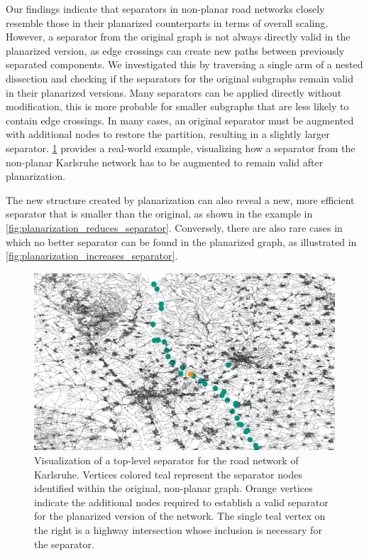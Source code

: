 Our findings indicate that separators in non-planar road networks closely resemble those in their planarized counterparts in terms of overall scaling.
However, a separator from the original graph is not always directly valid in the planarized version, as edge crossings can create new paths between previously separated components.
We investigated this by traversing a single arm of a nested dissection and checking if the separators for the original subgraphs remain valid in their planarized versions.
Many separators can be applied directly without modification, this is more probable for smaller subgraphs that are less likely to contain edge crossings.
In many cases, an original separator must be augmented with additional nodes to restore the partition, resulting in a slightly larger separator.
\cref{fig:karlsruhe_planar_vs_non_planar} provides a real-world example, visualizing how a separator from the non-planar Karlsruhe network has to be augmented to remain valid after planarization.

The new structure created by planarization can also reveal a new, more efficient separator that is smaller than the original, as shown in the example in \cref{fig:planarization_reduces_separator}.
Conversely, there are also rare cases in which no better separator can be found in the planarized graph, as illustrated in \cref{fig:planarization_increases_separator}.

\begin{figure}[tbhp]
    \centering
    \includegraphics[width=0.6\linewidth]{graphics/karlsruhe_top_level_sep_extended_to_planar_wide.png}
    \caption{Visualization of a top-level separator for the road network of Karlsruhe. Vertices colored teal represent the separator nodes identified within the original, non-planar graph. Orange vertices indicate the additional nodes required to establish a valid separator for the planarized version of the network. The single teal vertex on the right is a highway intersection whose inclusion is necessary for the separator.}
    \label{fig:karlsruhe_planar_vs_non_planar}
\end{figure}


